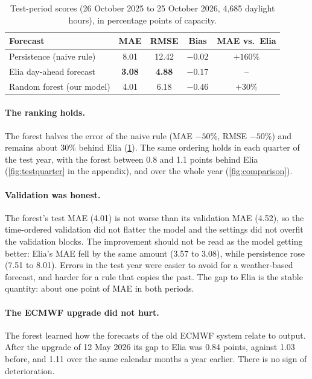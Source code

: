 \documentclass[11pt,a4paper]{article}
\begin{document}
\begin{table}[ht]
\centering\small
\caption{Test-period scores (26 October 2025 to 25 October 2026, 4,685 daylight hours), in
percentage points of capacity.}
\label{tab:test}
\begin{tabular}{@{}l c c c c@{}}
\toprule
Forecast & MAE & RMSE & Bias & MAE vs.\ Elia \\
\midrule
Persistence (naive rule)   & 8.01 & 12.42 & $-0.02$ & $+160\%$ \\
Elia day-ahead forecast    & \textbf{3.08} & \textbf{4.88} & $-0.17$ & -- \\
Random forest (our model)  & 4.01 & 6.18 & $-0.46$ & $+30\%$ \\
\bottomrule
\end{tabular}
\end{table}

\paragraph{The ranking holds.} The forest halves the error of the naive rule (MAE $-50\%$, RMSE
$-50\%$) and remains about 30\% behind Elia (\cref{tab:test}). The same ordering holds in each
quarter of the test year, with the forest between 0.8 and 1.1 points behind Elia
(\cref{fig:testquarter} in the appendix), and over the whole year (\cref{fig:comparison}).

\paragraph{Validation was honest.} The forest's test MAE (4.01) is not worse than its validation MAE
(4.52), so the time-ordered validation did not flatter the model and the settings did not overfit
the validation blocks. The improvement should not be read as the model getting better: Elia's MAE
fell by the same amount (3.57 to 3.08), while persistence rose (7.51 to 8.01). Errors in the test
year were easier to avoid for a weather-based forecast, and harder for a rule that copies the past.
The gap to Elia is the stable quantity: about one point of MAE in both periods.

\paragraph{The ECMWF upgrade did not hurt.} The forest learned how the forecasts of the old ECMWF
system relate to output. After the upgrade of 12 May 2026 its gap to Elia was 0.84 points, against
1.03 before, and 1.11 over the same calendar months a year earlier. There is no sign of
deterioration.
\end{document}
